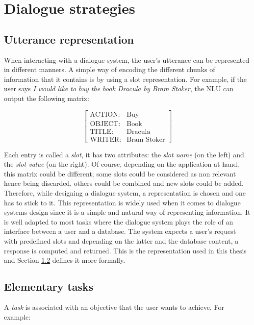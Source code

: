 \chapter{Dialogue strategies}
\label{ch:strategies}

\section{Utterance representation}
\label{sec:represent}
	
	When interacting with a dialogue system, the user's utterance can be represented in different manners. A simple way of encoding the different chunks of information that it contains is by using a slot representation. For example, if the user says \textit{I would like to buy the book Dracula by Bram Stoker}, the NLU can output the following matrix:
	
		$$
		\begin{bmatrix}
			\text{ACTION:} & \text{Buy} \\
			\text{OBJECT:} & \text{Book} \\
			\text{TITLE:} & \text{Dracula} \\
			\text{WRITER:} & \text{Bram Stoker}
		\end{bmatrix}
		$$
	
	Each entry is called a \textit{slot}, it has two attributes: the \textit{slot name} (on the left) and the \textit{slot value} (on the right). Of course, depending on the application at hand, this matrix could be different; some slots could be considered as non relevant hence being discarded, others could be combined and new slots could be added. Therefore, while designing a dialogue system, a representation is chosen and one has to stick to it. This representation is widely used when it comes to dialogue systems design since it is a simple and natural way of representing information. It is well adapted to most tasks where the dialogue system plays the role of an interface between a user and a database. The system expects a user's request with predefined slots and depending on the latter and the database content, a response is computed and returned. This is the representation used in this thesis and Section \ref{sec:elemtask} defines it more formally.

\section{Elementary tasks}
\label{sec:elemtask}

	A \textit{task} is associated with an objective that the user wants to achieve. For example:
	
